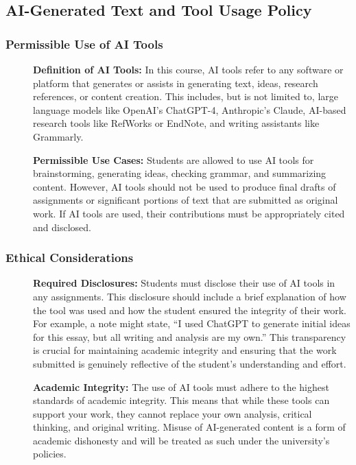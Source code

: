 \documentclass[11pt, letterpaper]{article}
\begin{document}
\subsection*{AI-Generated Text and Tool Usage Policy}

\subsubsection*{Permissible Use of AI Tools}
\begin{description}
    \item[]\textbf{Definition of AI Tools:} In this course, AI tools refer to any software or platform that generates or assists in generating text, ideas, research references, or content creation. This includes, but is not limited to, large language models like OpenAI's ChatGPT-4, Anthropic's Claude, AI-based research tools like RefWorks or EndNote, and writing assistants like Grammarly.

    \item[]\textbf{Permissible Use Cases:} Students are allowed to use AI tools for brainstorming, generating ideas, checking grammar, and summarizing content. However, AI tools should not be used to produce final drafts of assignments or significant portions of text that are submitted as original work. If AI tools are used, their contributions must be appropriately cited and disclosed.
\end{description}

\subsubsection*{Ethical Considerations}

\begin{description}
    \item[]\textbf{Required Disclosures:} Students must disclose their use of AI tools in any assignments. This disclosure should include a brief explanation of how the tool was used and how the student ensured the integrity of their work. For example, a note might state, ``I used ChatGPT to generate initial ideas for this essay, but all writing and analysis are my own.'' This transparency is crucial for maintaining academic integrity and ensuring that the work submitted is genuinely reflective of the student's understanding and effort.
    \item[] \textbf{Academic Integrity:} The use of AI tools must adhere to the highest standards of academic integrity. This means that while these tools can support your work, they cannot replace your own analysis, critical thinking, and original writing. Misuse of AI-generated content is a form of academic dishonesty and will be treated as such under the university's policies.
\end{description}
\end{document}

